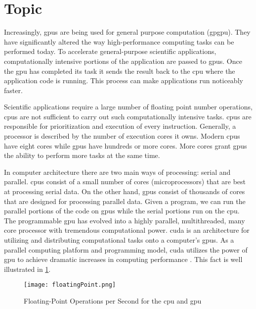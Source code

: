 \section{Topic}

Increasingly, \Glspl{gpu} are being used for general purpose computation
(\gls{gpgpu}). They have significantly altered the way high-performance
computing tasks can be performed today. To accelerate general-purpose
scientific applications, computationally intensive portions of the application
are passed to \glspl{gpu}. Once the \gls{gpu} has completed its task it sends
the result back to the \Gls{cpu} where the application code is running. This
process can make applications run noticeably faster.

Scientific applications require a large number of floating point number
operations, \Glspl{cpu} are not sufficient to carry out such computationally
intensive tasks. \glspl{cpu} are responsible for prioritization and execution
of every instruction. Generally, a processor is described by the number of
execution cores it owns. Modern \glspl{cpu} have eight cores while \Glspl{gpu}
have hundreds or more cores. More cores grant \glspl{gpu} the ability to
perform more tasks at the same time.

In computer architecture there are two main ways of processing: serial and
parallel. \Glspl{cpu} consist of a small number of cores (microprocessors) that
are best at processing serial data. On the other hand, \glspl{gpu} consist of
thousands of cores that are designed for processing parallel data. Given a
program, we can run the parallel portions of the code on \glspl{gpu} while the
serial portions run on the \gls{cpu}\@. The programmable \gls{gpu} has evolved
into a highly parallel, multithreaded, many core processor with tremendous
computational power. \Gls{cuda} is an architecture for utilizing and
distributing computational tasks onto a computer's \glspl{gpu}. As a parallel
computing platform and programming model, \gls{cuda} utilizes the power of
\gls{gpu} to achieve dramatic increases in computing performance
\cite{website:cudaCProgrammingGuide}. This fact is well illustrated in
\cref{fig:flops_gpu_vs_cpu}.

\begin{figure}[htb]
\centering
\texttt{[image: floatingPoint.png]}
\caption{Floating-Point Operations per Second for the \gls{cpu} and
         \gls{gpu} \cite{website:cudaCProgrammingGuide}}
\label{fig:flops_gpu_vs_cpu}
\end{figure}

